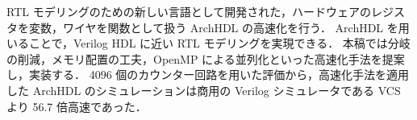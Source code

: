 RTL モデリングのための新しい言語として開発された，ハードウェアのレジスタを変数，ワイヤを関数として扱う ArchHDL の高速化を行う．
ArchHDL を用いることで，Verilog HDL に近い RTL モデリングを実現できる．
本稿では分岐の削減，メモリ配置の工夫，OpenMP による並列化といった高速化手法を提案し，実装する．
4096 個のカウンター回路を用いた評価から，高速化手法を適用した ArchHDL のシミュレーションは商用の Verilog シミュレータである VCS より 56.7 倍高速であった．